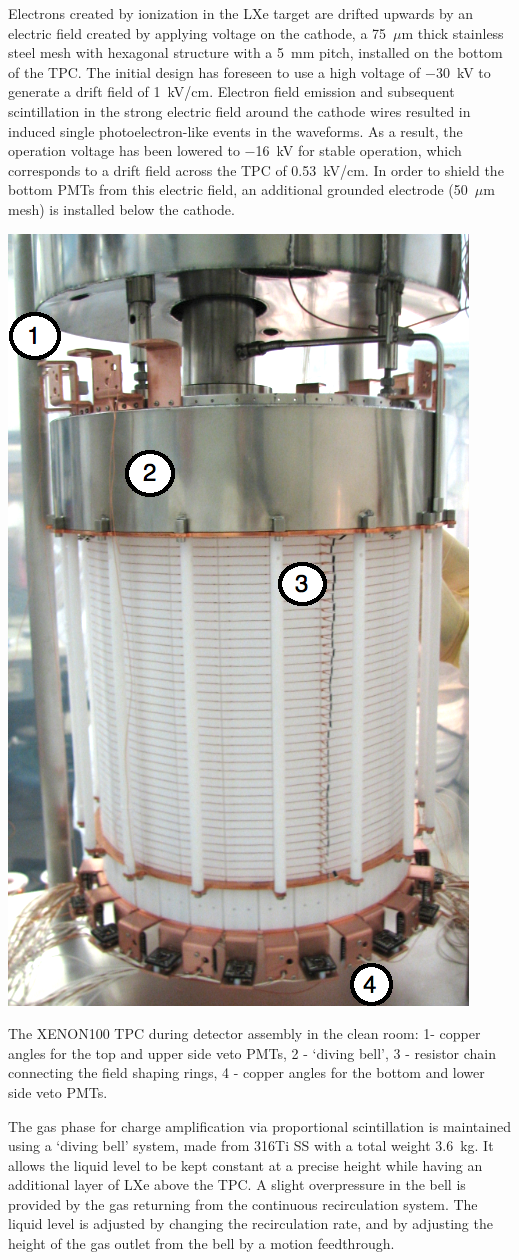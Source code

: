 Electrons created by ionization in the LXe target are drifted upwards by an electric field created by applying voltage on the cathode, a 75~$\mu$m thick stainless steel mesh with hexagonal structure with a 5~mm pitch, installed on the bottom of the TPC. The initial design has foreseen to use a high voltage of $-$30~kV to generate a drift field of 1~kV/cm. Electron field emission and subsequent scintillation in the strong electric field around the cathode wires resulted in induced single photoelectron-like events in the waveforms. As a result, the operation voltage has been lowered to $-$16~kV for stable operation, which corresponds to a drift field across the TPC of 0.53~kV/cm. In order to shield the bottom PMTs from this electric field, an additional grounded electrode (50~$\mu$m mesh) is installed below the cathode.

\begin{floatingfigure}[l]{0.45\textwidth}
\centering
\includegraphics[height=0.65\linewidth]{plots/Detector/TPC_withLabels.png}
\caption[The XENON100 time-projection chamber]{The XENON100 TPC during detector assembly in the clean room: 1- copper angles for the top and upper side veto PMTs, 2 - `diving bell', 3 - resistor chain connecting the field shaping rings, 4 - copper angles for the bottom and lower side veto PMTs.}
\label{figTPC}
\end{floatingfigure}

The gas phase for charge amplification via proportional scintillation is maintained using a `diving bell' system, made from 316Ti SS with a total weight 3.6~kg. It allows the liquid level to be kept constant at a precise height while having an additional layer of LXe above the TPC. A slight overpressure in the bell is provided by the gas returning from the continuous recirculation system.
The liquid level is adjusted by changing the recirculation rate, and by adjusting the height of the gas outlet from the bell by a motion feedthrough.

